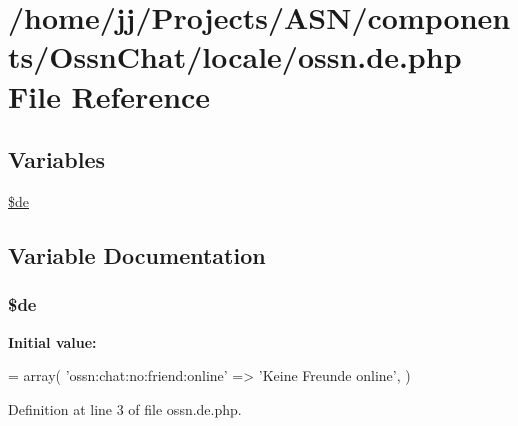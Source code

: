 \hypertarget{components_2_ossn_chat_2locale_2ossn_8de_8php}{}\section{/home/jj/\+Projects/\+A\+S\+N/components/\+Ossn\+Chat/locale/ossn.de.\+php File Reference}
\label{components_2_ossn_chat_2locale_2ossn_8de_8php}
\subsection*{Variables}
\begin{DoxyCompactItemize}
\item 
\hyperlink{components_2_ossn_chat_2locale_2ossn_8de_8php_aab7de7e51b4580005f63dd4cf5e17311}{\$de}
\end{DoxyCompactItemize}


\subsection{Variable Documentation}
\subsubsection[{\texorpdfstring{\$de}{$de}}]{\setlength{\rightskip}{0pt plus 5cm}\$de}\hypertarget{components_2_ossn_chat_2locale_2ossn_8de_8php_aab7de7e51b4580005f63dd4cf5e17311}{}\label{components_2_ossn_chat_2locale_2ossn_8de_8php_aab7de7e51b4580005f63dd4cf5e17311}
{\bfseries Initial value\+:}
\begin{DoxyCode}
= array(
    \textcolor{stringliteral}{'ossn:chat:no:friend:online'} => \textcolor{stringliteral}{'Keine Freunde online'},
)
\end{DoxyCode}


Definition at line 3 of file ossn.\+de.\+php.

